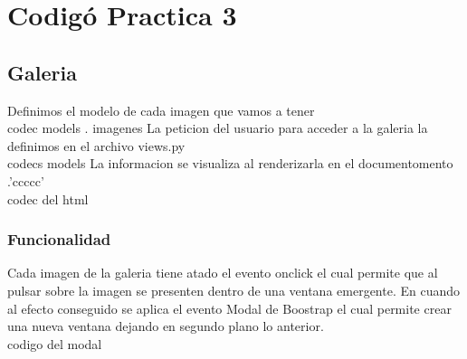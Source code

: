 

\chapter{Codigó Practica 3} %

\label{Anexo3} %
\section{Galeria}
Definimos el modelo de cada imagen que vamos a tener 
\\ codec models . imagenes
La peticion del usuario para acceder a la galeria la definimos en el archivo views.py
\\ codecs models
La informacion se visualiza al renderizarla en el documentomento .'ccccc' 
\\ codec del html
\subsection{Funcionalidad}
Cada imagen de la galeria tiene atado el evento onclick el cual permite que al pulsar sobre la imagen se presenten dentro de una ventana emergente. En cuando al efecto conseguido se aplica el evento Modal de Boostrap el cual permite crear una nueva ventana dejando en segundo plano lo anterior.
\\ codigo del modal
